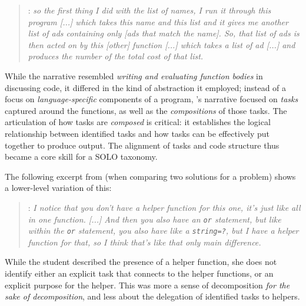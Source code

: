 \begin{quote}
\stwelve: \textit{so the first thing I did with the list of names, I
  run it through this program [...] which
  takes this name and this list and it gives me another list of ads
  containing only [ads that match the name]. So, that list of ads is
  then acted on by this [other] function [...] which takes a list of ad [...] and produces the number of the total cost of that list.}
\end{quote}

While the narrative resembled \emph{writing and evaluating function bodies} in
discussing code, it differed in the
kind of abstraction it employed; instead of a focus on
\emph{language-specific} components of a program, \stwelve's narrative
focused on \emph{tasks} captured around the functions, as well as the
\emph{compositions} of those tasks. The articulation of how tasks
are \emph{composed} is critical: it establishes the logical
relationship between identified tasks and how tasks
can be effectively put together to produce output. The alignment of
tasks and code structure thus became a core skill for a SOLO taxonomy.

The following excerpt from %
\sfour (when comparing two
solutions for a problem) shows a lower-level variation of this:


\begin{quote}
\sfour: \textit{I notice that you don't have a helper function for this one, it's just like all in one function. [...] And then you also have an \lstinline{or} statement, but like within the \lstinline{or} statement, you also have like a \lstinline{string=?}, but I have a helper function for that, so I think that's like that only main difference.}
\end{quote}

While the student described the presence of a helper function, she
does not identify either an explicit task that connects to the helper
functions, or an explicit purpose for the helper.  This was more a
sense of decomposition \emph{for the sake of decomposition}, and less
about the delegation of identified tasks to helpers.

